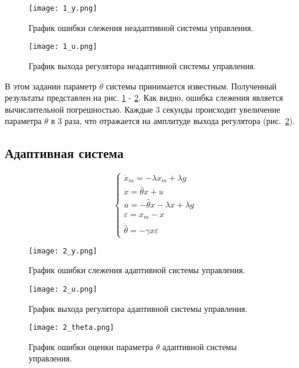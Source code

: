 \documentclass{article}
\begin{document}
\begin{figure}[h!]
  \centering
  \texttt{[image: 1\_y.png]}
  \caption{График ошибки слежения неадаптивной системы управления.} 
  \label{fig:task1_y}
\end{figure}

\begin{figure}[h!]
  \centering
  \texttt{[image: 1\_u.png]}
  \caption{График выхода регулятора неадаптивной системы управления.}
  \label{fig:task1_u}
\end{figure}

В этом задании параметр \(\theta\) системы принимается известным. 
Полученный результаты представлен на рис. \ref{fig:task1_y} - \ref{fig:task1_u}. 
Как видно, ошибка слежения является вычислительной погрешностью. 
Каждые 3 секунды происходит увеличение параметра \(\theta\) в 3 раза, что отражается на амплитуде выхода регулятора (рис.~\ref{fig:task1_u}).

\FloatBarrier
\subsection{Адаптивная система}
$$
    \begin{cases}
      \dot x_m = -\lambda x_m + \lambda g \\
      \dot x = \hat \theta x + u\\
      u = - \hat \theta x - \lambda x + \lambda g\\
      \varepsilon = x_m - x \\
      \dot{ \hat \theta} = -\gamma x \varepsilon 
    \end{cases} 
$$
\begin{figure}[h!]
    \centering
    \texttt{[image: 2\_y.png]}
    \caption{График ошибки слежения адаптивной системы управления.}
    \label{fig:task2_y}
\end{figure}
\begin{figure}[h!]
  \centering
  \texttt{[image: 2\_u.png]}
  \caption{График выхода регулятора адаптивной системы управления.}
  \label{fig:task2_u}
\end{figure}

\begin{figure}[h!]
  \centering
  \texttt{[image: 2\_theta.png]}
  \caption{График ошибки оценки параметра \( \theta\) адаптивной системы управления.}
  \label{fig:task2_theta}
\end{figure}
\end{document}
